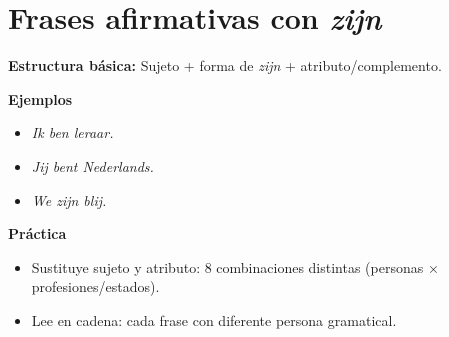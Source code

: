 \section{Frases afirmativas con \textit{zijn}}
\textbf{Estructura básica:} Sujeto + forma de \textit{zijn} + atributo/complemento.

\textbf{Ejemplos}
\begin{itemize}[leftmargin=*]
  \item \textit{Ik ben leraar.}
  \item \textit{Jij bent Nederlands.}
  \item \textit{We zijn blij.}
\end{itemize}

\textbf{Práctica}
\begin{itemize}[leftmargin=*]
  \item Sustituye sujeto y atributo: 8 combinaciones distintas (personas × profesiones/estados).
  \item Lee en cadena: cada frase con diferente persona gramatical.
\end{itemize}
